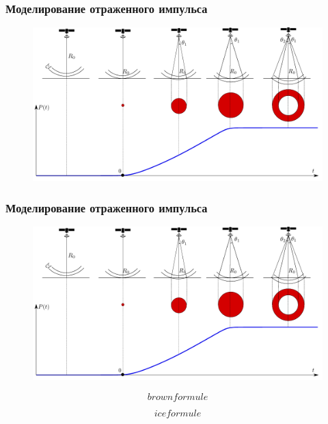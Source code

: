 \documentclass[10pt,pdf,hyperref={unicode}, dvipsnames]{beamer}
\begin{document}
\begin{frame}[t]
	\frametitle{Моделирование отраженного импульса}
    \begin{figure}[h]
        \centering
        \includegraphics[width=\linewidth]{fig/flat_wave1.pdf}
    \end{figure}
\end{frame}

\begin{frame}[t]
	\frametitle{Моделирование отраженного импульса}
    \begin{figure}[h]
        \centering
        \includegraphics[width=\linewidth]{fig/flat_wave1.pdf}
    \end{figure}


	\begin{minipage}{0.49\linewidth}
        \begin{equation}
            brown formule
        \end{equation}
	\end{minipage}
	\hfill
	\begin{minipage}{0.49\linewidth}
        \begin{equation}
            ice formule
        \end{equation}
	\end{minipage}
\end{frame}
\end{document}
